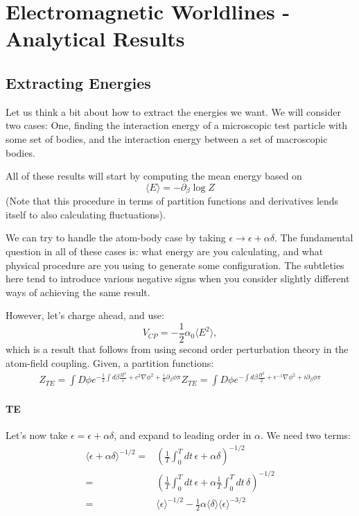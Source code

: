\chapter{Electromagnetic Worldlines - Analytical Results}

\section{Extracting Energies}

Let us think a bit about how to extract the energies we want.  We will consider two cases:  One, finding the interaction energy of a microscopic test particle with some set of bodies, and the interaction energy between a set of macroscopic bodies. 

All of these results will start by computing the mean energy based on 
\begin{equation}
\langle E\rangle = -\partial_\beta\log Z
\end{equation}
(Note that this procedure in terms of partition functions and derivatives lends itself to also calculating fluctuations).  

We can try to handle the atom-body case by taking $\epsilon \rightarrow \epsilon + \alpha\delta$.  The fundamental question in all of these cases is: what energy are you calculating, and what physical procedure are you using to generate some configuration.  The subtleties here tend to introduce various negative signs when you consider slightly different ways of achieving the same result.  

However, let's charge ahead, and use: 
\begin{equation}
V_{CP} = -\frac{1}{2}\alpha_0\langle E^2\rangle,
\end{equation}
which is a result that follows from using second order perturbation theory in the atom-field coupling.  Given, a partition functions: 
\begin{align}
Z_{TE} = \int D\phi e^{-\frac{1}{2}\int d\beta \frac{\Pi^2}{\epsilon} + c^2\nabla\phi^2+\frac{i}{\hbar}\partial_\beta\phi \pi  }
Z_{TE} = \int D\phi e^{-\int d\beta \frac{\Pi^2}{2} + \epsilon^{-1}\nabla\phi^2+i\partial_\beta\phi \pi  }
\end{align}

\subsubsection{TE}
Let's now take $\epsilon = \epsilon+\alpha\delta$, and expand to leading order in $\alpha.$  
We need two terms:
\begin{align}
\langle\epsilon+\alpha\delta\rangle^{-1/2} =&  \left(\frac{1}{T}\int_0^Tdt\,\epsilon + \alpha\delta\right)^{-1/2}\\
=& \left(\frac{1}{T}\int_0^Tdt\,\epsilon + \alpha\frac{1}{T}\int_0^Tdt\,\delta\right)^{-1/2}\\
=& \langle\epsilon\rangle^{-1/2} -\frac{1}{2}\alpha\langle\delta\rangle\langle\epsilon\rangle^{-3/2}
\end{align}
